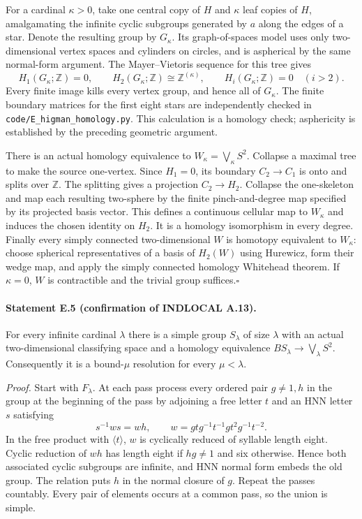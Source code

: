 For a cardinal $\kappa>0$, take one central copy of $H$ and
$\kappa$ leaf copies of $H$, amalgamating the infinite cyclic
subgroups generated by $a$ along the edges of a star. Denote
the resulting group by $G_\kappa$. Its graph-of-spaces model
uses only two-dimensional vertex spaces and cylinders on circles,
and is aspherical by the same normal-form argument. The
Mayer--Vietoris sequence for this tree gives
\[
 H_1(G_\kappa;\mathbb Z)=0,\qquad
 H_2(G_\kappa;\mathbb Z)\cong\mathbb Z^{(\kappa)},\qquad
 H_i(G_\kappa;\mathbb Z)=0\quad(i>2).
\]
Every finite image kills every vertex group, and hence all of
$G_\kappa$. The finite boundary matrices for the first eight stars
are independently checked in \texttt{code/E\_higman\_homology.py}.
This calculation is a homology check; asphericity is established
by the preceding geometric argument.

There is an actual homology equivalence to
$W_\kappa=\bigvee_\kappa S^2$. Collapse a maximal tree to make
the source one-vertex. Since $H_1=0$, its boundary
$C_2\to C_1$ is onto and splits over $\mathbb Z$. The splitting
gives a projection $C_2\to H_2$. Collapse the one-skeleton and
map each resulting two-sphere by the finite pinch-and-degree map
specified by its projected basis vector. This defines a continuous
cellular map to $W_\kappa$ and induces the chosen identity on
$H_2$. It is a homology isomorphism in every degree.
Finally every simply connected two-dimensional $W$ is homotopy
equivalent to $W_\kappa$: choose spherical representatives of a
basis of $H_2(W)$ using Hurewicz, form their wedge map, and apply
the simply connected homology Whitehead theorem. If $\kappa=0$,
$W$ is contractible and the trivial group suffices.\hfill$\square$

\paragraph{Statement E.5 (confirmation of INDLOCAL A.13).}
For every infinite cardinal $\lambda$ there is a simple group
$S_\lambda$ of size $\lambda$ with an actual two-dimensional
classifying space and a homology equivalence
$BS_\lambda\to\bigvee_\lambda S^2$. Consequently it is a
bound-$\mu$ resolution for every $\mu<\lambda$.

\emph{Proof.}
Start with $F_\lambda$. At each pass process every ordered pair
$g\ne1,h$ in the group at the beginning of the pass by adjoining
a free letter $t$ and an HNN letter $s$ satisfying
\[
 s^{-1}ws=wh,\qquad
 w=gtg^{-1}t^{-1}gt^2g^{-1}t^{-2}.
\]
In the free product with $\langle t\rangle$, $w$ is cyclically
reduced of syllable length eight. Cyclic reduction of $wh$
has length eight if $hg\ne1$ and six otherwise. Hence both
associated cyclic subgroups are infinite, and HNN normal form
embeds the old group. The relation puts $h$ in the normal
closure of $g$. Repeat the passes countably. Every pair of
elements occurs at a common pass, so the union is simple.

